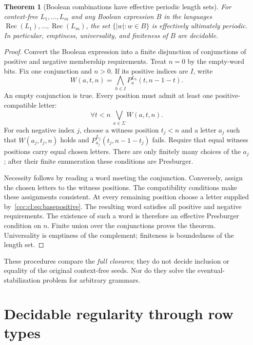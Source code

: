 \documentclass[11pt,letterpaper]{article}
\newtheorem{theorem}{Theorem}[section]
\theoremstyle{definition}
\theoremstyle{remark}
\newcommand{\rec}{\operatorname{Rec}}
\begin{document}
\begin{theorem}[Boolean combinations have effective periodic length sets]
\label{ccc:cl:thm:boolean}
For context-free $L_1,\ldots,L_m$ and any Boolean expression $B$ in the
languages $\rec(L_1),\ldots,\rec(L_m)$, the set
$\{|w|:w\in B\}$ is effectively ultimately periodic. In particular,
emptiness, universality, and finiteness of $B$ are decidable.
\end{theorem}
\begin{proof}
Convert the Boolean expression into a finite disjunction of conjunctions
of positive and negative membership requirements. Treat $n=0$ by the
empty-word bits. Fix one conjunction and $n>0$. If its positive indices
are $I$, write
\[
 W(a,t,n)=\bigwedge_{h\in I}P_a^{L_h}(t,n-1-t).
\]
An empty conjunction is true. Every position must admit at least one
positive-compatible letter:
\begin{equation}\label{ccc:cl:eq:basepositive}
 \forall t<n\ \bigvee_{a\in\Sigma}W(a,t,n).
\end{equation}
For each negative index $j$, choose a witness position $t_j<n$ and a
letter $a_j$ such that $W(a_j,t_j,n)$ holds and
$P_{a_j}^{L_j}(t_j,n-1-t_j)$ fails. Require that equal witness positions
carry equal chosen letters. There are only finitely many choices of the
$a_j$; after their finite enumeration these conditions are Presburger.

Necessity follows by reading a word meeting the conjunction. Conversely,
assign the chosen letters to the witness positions. The compatibility
conditions make these assignments consistent. At every remaining position
choose a letter supplied by~\eqref{ccc:cl:eq:basepositive}. The resulting word
satisfies all positive and negative requirements. The existence of such a
word is therefore an effective Presburger condition on $n$. Finite union
over the conjunctions proves the theorem. Universality is emptiness of the
complement; finiteness is boundedness of the length set.
\end{proof}

These procedures compare the \emph{full closures}; they do not decide
inclusion or equality of the original context-free seeds. Nor do they solve
the eventual-stabilization problem for arbitrary grammars.

\section{Decidable regularity through row types}\label{ccc:cl:sec:regularity}
\end{document}
